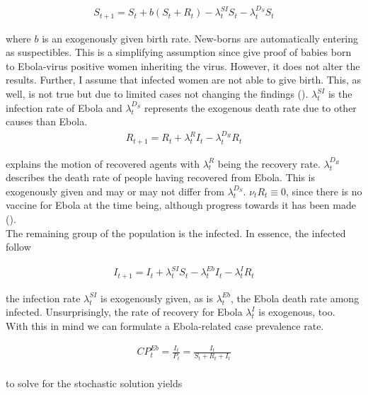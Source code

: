 \documentclass{article}
\begin{document}
\begin{align*}
S_{t+1} = S_t + b (S_t + R_t) - \lambda_t^{SI} S_t - \lambda_t^{D_S} S_t
\end{align*}

where $b$ is an exogenously given birth rate. New-borns are automatically entering as suspectibles. This is a simplifying assumption since \cite{dornemann2017first} give proof of babies born to Ebola-virus positive women inheriting the virus. However, it does not alter the results. Further, I assume that infected women are not able to give birth. This, as well, is not true but due to limited cases not changing the findings (\cite{baggi2014management}). $\lambda_t^{SI}$ is the infection rate of Ebola and $\lambda_t^{D_S}$ represents the exogenous death rate due to other causes than Ebola. \\

\begin{align*}
R_{t+1} = R_t + \lambda_t^{R} I_t - \lambda_t^{D_R} R_t
\end{align*}

explains the motion of recovered agents with $\lambda_t^{R}$ being the recovery rate. $\lambda_t^{D_R}$ describes the death rate of people having recovered from Ebola. This is exogenously given and may or may not differ from $\lambda_t^{D_S}$. $\nu_t R_t \equiv 0$, since there is no vaccine for Ebola at the time being, although progress towards it has been made (\cite{ledgerwood2017chimpanzee}).\\
The remaining group of the population is the infected. In essence, the infected follow

\begin{align*}
I_{t+1} = I_t + \lambda_t^{SI} S_t - \lambda_t^{Eb} I_t - \lambda_t^{I} R_t
\end{align*}

the infection rate $\lambda_t^{SI}$ is exogenously given, as is $\lambda_t^{Eb}$, the Ebola death rate among infected. Unsurprisingly, the rate of recovery for Ebola $\lambda_t^{I}$ is exogenous, too. \\
With this in mind we can formulate a Ebola-related case prevalence rate.

\begin{align*}
CP_{t}^{Eb} = \frac{I_t}{P_t} = \frac{I_t}{S_t + R_t + I_t} \\
\end{align*} 

to solve for the stochastic solution yields
\end{document}
